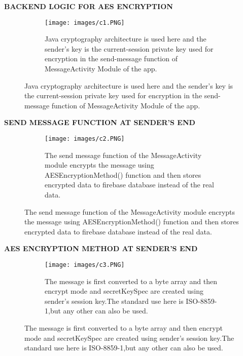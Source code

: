 \documentclass{beamer}
\begin{document}
\begin{frame}
\begin{tcolorbox}
\begin{center}
\textsc{\textbf{\textcolor{byzantium}{BACKEND LOGIC FOR AES ENCRYPTION}}}
\end{center}
\end{tcolorbox}
\begin{figure}
\centering
\begin{subfigure}{\textwidth}
  \centering
   \begin{center}
  \caption{
  Java cryptography architecture is used here and the sender’s key is the current-session private key used for encryption in the send-message function of MessageActivity Module of the app.}
  \end{center}
  \texttt{[image: images/c1.PNG]}
  \label{fig:sub1}
\end{subfigure}
\end{figure}
\end{frame}


\begin{frame}
\begin{tcolorbox}
\begin{center}
\textsc{\textbf{\textcolor{byzantium}{SEND MESSAGE FUNCTION AT SENDER'S END}}}
\end{center}
\end{tcolorbox}
\begin{figure}
\centering
\begin{subfigure}{\textwidth}
  \centering
   \begin{center}
  \caption{
  The send message function of the MessageActivity module encrypts the message using AESEncryptionMethod() function and then stores encrypted data to firebase database instead of the real data.}
  \end{center}
  \texttt{[image: images/c2.PNG]}
  \label{fig:sub1}
\end{subfigure}
\end{figure}
\end{frame}


\begin{frame}
\begin{tcolorbox}
\begin{center}
\textsc{\textbf{\textcolor{byzantium}{AES ENCRYPTION METHOD AT SENDER'S END}}}
\end{center}
\end{tcolorbox}
\begin{figure}
\centering
\begin{subfigure}{\textwidth}
  \centering
    \begin{center}
  \caption{
  The message is first converted to a byte array and then encrypt mode and secretKeySpec are created using sender’s session key.The standard use here is ISO-8859-1,but any other can also be used.}
  \end{center}
  \texttt{[image: images/c3.PNG]}

  \label{fig:sub1}
\end{subfigure}
\end{figure}
\end{frame}
\end{document}
